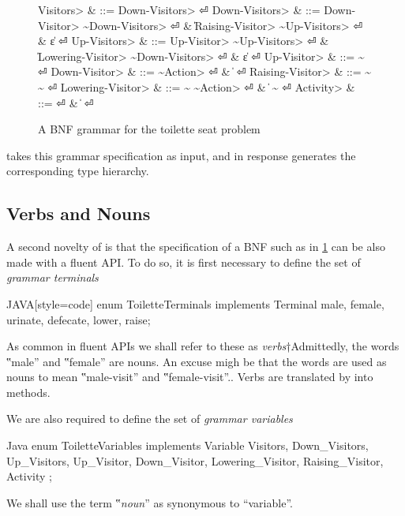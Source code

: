 \begin{figure}[htbp]
  \begin{Grammar}
    \begin{aligned}
      \<Visitors>         & ::= \<Down-Visitors> \hfill⏎
      \<Down-Visitors>    & ::= \<Down-Visitor> \~\<Down-Visitors> \hfill⏎
      {}                  & \| \<Raising-Visitor> \~\<Up-Visitors> \hfill⏎
      {}                  & \| ε \hfill⏎
      \<Up-Visitors>      & ::= \<Up-Visitor> \~\<Up-Visitors> \hfill⏎
      {}                  & \| \<Lowering-Visitor> \~\<Down-Visitors> \hfill⏎
      {}                  & \| ε \hfill⏎
      \<Up-Visitor>       & ::=  \~ \hfill⏎
      \<Down-Visitor>     & ::=  \~\<Action> \hfill⏎
                          & \|   \hfill⏎
      \<Raising-Visitor>  & ::=  \~ \~ \hfill⏎
      \<Lowering-Visitor> & ::=  \~ \~\<Action> \hfill⏎
                          & \|  \~  \hfill⏎
      \<Activity>         & ::=  \hfill⏎
                          & \|  \hfill⏎
    \end{aligned}
  \end{Grammar}
  \caption{A BNF grammar for the toilette seat problem}
  \label{Figure:BNF}
\end{figure}

\SELF takes this grammar specification as input, and in response
  generates the corresponding
  \Java type hierarchy.

\subsection{Verbs and Nouns}
A second novelty of \SELF is that the specification of a BNF such as in 
  \cref{Figure:BNF} can be also made with a \Java fluent API.
To do so, it is first necessary to
  define the set of \emph{grammar terminals}
  \begin{code}{JAVA}[style=code]
enum ToiletteTerminals implements Terminal {
  male, female,
  urinate, defecate,
  lower, raise;
}
\end{code}
As common in fluent APIs we shall refer to these
as \emph{verbs}†{Admittedly, the words ‟male” and ‟female” are nouns. 
  An excuse migh be that the words are used as nouns to mean ‟male-visit” and ‟female-visit”.}.
Verbs are translated by \SELF into methods.

We are also required to define the set of \emph{grammar variables}
\begin{code}{Java}
enum ToiletteVariables implements Variable {
  Visitors, Down_Visitors, Up_Visitors,
  Up_Visitor, Down_Visitor,
  Lowering_Visitor, Raising_Visitor,
  Activity
};
\end{code}
  We shall use the term ‟\emph{noun}” as synonymous to ``variable''.

